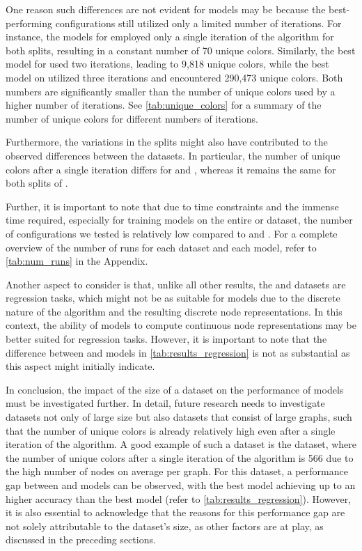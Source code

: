 One reason such differences are not evident for \wlnn models may be because the best-performing \wlnn configurations still utilized only a limited number of \wl iterations. For instance, the models for \alchemy employed only a single iteration of the \wl algorithm for both splits, resulting in a constant number of 70 unique colors. Similarly, the best model for \zincten used two iterations, leading to 9,818 unique colors, while the best model on \zinc utilized three iterations and encountered 290,473 unique colors. Both numbers are significantly smaller than the number of unique colors used by a higher number of iterations. See \cref{tab:unique_colors} for a summary of the number of unique colors for different numbers of \wl iterations.

Furthermore, the variations in the splits might also have contributed to the observed differences between the datasets. In particular, the number of unique colors after a single \wl iteration differs for \zinc and \zincten, whereas it remains the same for both splits of \alchemy. 

Further, it is important to note that due to time constraints and the immense time required, especially for training models on the entire \alchemy or \zinc dataset, the number of configurations we tested is relatively low compared to \zincten and \alchemyten. For a complete overview of the number of runs for each dataset and each model, refer to \cref{tab:num_runs} in the Appendix.

Another aspect to consider is that, unlike all other results, the \alchemy and \zinc datasets are regression tasks, which might not be as suitable for \wlnn models due to the discrete nature of the \wl algorithm and the resulting discrete node representations. In this context, the ability of \gnn models to compute continuous node representations may be better suited for regression tasks. However, it is important to note that the difference between \gnn and \wlnn models in \cref{tab:results_regression} is not as substantial as this aspect might initially indicate.

In conclusion, the impact of the size of a dataset on the performance of \wlnn models must be investigated further. In detail, future research needs to investigate datasets not only of large size but also datasets that consist of large graphs, such that the number of unique colors is already relatively high even after a single iteration of the \wl algorithm. A good example of such a dataset is the \reddit dataset, where the number of unique colors after a single iteration of the \wl algorithm is 566 due to the high number of nodes on average per graph. For this dataset, a performance gap between \wlnn and \gnn models can be observed, with the best \gnn model achieving up to an  higher accuracy than the best \wlnn model (refer to \cref{tab:results_regression}). However, it is also essential to acknowledge that the reasons for this performance gap are not solely attributable to the dataset's size, as other factors are at play, as discussed in the preceding sections.

